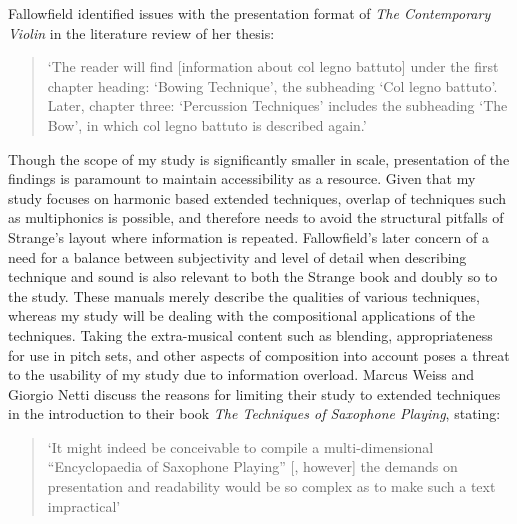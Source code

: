 Fallowfield identified issues with the presentation format of \emph{The Contemporary Violin} in the literature review of her thesis: 
\begin{quotation}
    ‘The reader will find [information about col legno battuto] under the first chapter heading: ‘Bowing Technique’, the subheading ‘Col legno battuto’. Later, chapter three: ‘Percussion Techniques’ includes the subheading ‘The Bow’, in which col legno battuto is described again.’\autocite[12]{fallowfieldCelloMapHandbook2009}
\end{quotation}
Though the scope of my study is significantly smaller in scale, presentation of the findings is paramount to maintain accessibility as a resource. 
Given that my study focuses on harmonic based extended techniques, overlap of techniques such as multiphonics is possible, and therefore needs to avoid the structural pitfalls of Strange’s layout where information is repeated. 
Fallowfield’s later concern of a need for a balance between subjectivity and level of detail when describing technique and sound is also relevant to both the Strange book and doubly so to the study. 
These manuals merely describe the qualities of various techniques, whereas my study will be dealing with the compositional applications of the techniques. 
Taking the extra-musical content such as blending, appropriateness for use in pitch sets, and other aspects of composition into account poses a threat to the usability of my study due to information overload. 
Marcus Weiss and Giorgio Netti discuss the reasons for limiting their study to extended techniques in the introduction to their book \emph{The Techniques of Saxophone Playing}, stating:
\begin{quotation}
    ‘It might indeed be conceivable to compile a multi-dimensional “Encyclopaedia of Saxophone Playing” [, however] the demands on presentation and readability would be so complex as to make such a text impractical’\autocite[Introduction]{weissTechniquesSaxophonePlaying2010}
\end{quotation}


